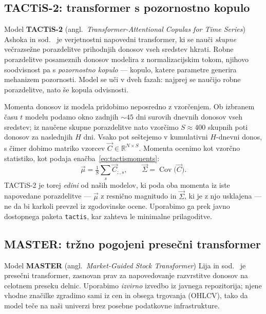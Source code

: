 \newpage

\subsection{TACTiS-2: transformer s pozornostno kopulo}
\label{sec:tactis}
Model \textbf{TACTiS-2} (angl.\ \emph{Transformer-Attentional Copulas for Time Series}) Ashoka in sod.~\cite{ashok2024tactis} je verjetnostni napovedni transformer, ki se nauči \emph{skupne} večrazsežne porazdelitve prihodnjih donosov vseh sredstev hkrati. Robne porazdelitve posameznih donosov modelira z normalizacijskim tokom, njihovo soodvisnost pa s \emph{pozornostno kopulo} --- kopulo, katere parametre generira mehanizem pozornosti. Model se uči v dveh fazah: najprej se naučijo robne porazdelitve, nato še kopula odvisnosti.

Momenta donosov iz modela pridobimo neposredno z vzorčenjem. Ob izbranem času $t$ modelu podamo okno zadnjih $\sim\!45$ dni surovih dnevnih donosov vseh sredstev; iz naučene skupne porazdelitve nato vzorčimo $S\!\approx\!400$ skupnih poti donosov za naslednjih $H$ dni. Vsako pot seštejemo v kumulativni $H$-dnevni donos, s čimer dobimo matriko vzorcev $\vec{C}\in\mathbb{R}^{N\times S}$. Momenta ocenimo kot vzorčno statistiko, kot podaja enačba~\eqref{eq:tactismoments}:
\begin{equation}
\label{eq:tactismoments}
  \vec{\mu} = \tfrac{1}{S}\textstyle\sum_{s} \vec{C}_{:,s}, \qquad
  \vec{\Sigma} = \operatorname{Cov}\!\big(\vec{C}\big).
\end{equation}
TACTiS-2 je torej \emph{edini} od naših modelov, ki poda oba momenta iz iste napovedane porazdelitve --- $\vec{\mu}$ z resnično magnitudo in $\vec{\Sigma}$, ki je z njo usklajena --- ne da bi karkoli prevzel iz zgodovinske ocene. Uporabimo ga prek javno dostopnega paketa \texttt{tactis}, kar zahteva le minimalne prilagoditve.

\subsection{MASTER: tržno pogojeni presečni transformer}
\label{sec:master}
Model \textbf{MASTER} (angl.\ \emph{Market-Guided Stock Transformer}) Lija in sod.~\cite{li2024master} je presečni transformer, zasnovan prav za napovedovanje razvrstitve donosov na celotnem preseku delnic. Uporabimo \emph{izvirno} izvedbo iz javnega repozitorija; njene vhodne značilke zgradimo sami iz cen in obsega trgovanja (OHLCV), tako da model teče na naši univerzi brez posebne podatkovne infrastrukture.


